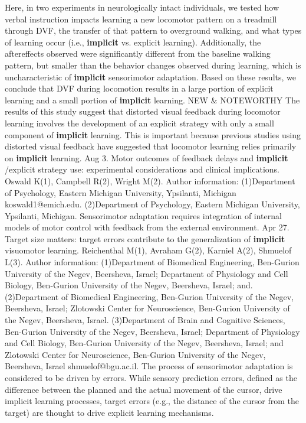 \documentclass[11pt]{article}
\begin{document}
\newline  [  91  ]   Here, in two experiments in neurologically intact individuals, we tested  how verbal instruction impacts learning a new locomotor pattern on a treadmill  through DVF, the transfer of that pattern to overground walking, and what types  of learning occur (i.e.,   \textbf {  implicit  }   vs. explicit learning).
\newline  [  92  ]   Additionally, the aftereffects observed were significantly  different from the baseline walking pattern, but smaller than the behavior  changes observed during learning, which is uncharacteristic of   \textbf {  implicit  }    sensorimotor adaptation.
\newline  [  93  ]   Based on these  results, we conclude that DVF during locomotion results in a large portion of  explicit learning and a small portion of   \textbf {  implicit  }   learning.
\newline  [  94  ]   NEW & NOTEWORTHY The  results of this study suggest that distorted visual feedback during locomotor  learning involves the development of an explicit strategy with only a small  component of   \textbf {  implicit  }   learning.
\newline  [  95  ]   This is important because previous studies using  distorted visual feedback have suggested that locomotor learning relies  primarily on   \textbf {  implicit  }   learning.
 Aug 3.  Motor outcomes of feedback delays and   \textbf {  implicit  }  /explicit strategy use:  experimental considerations and clinical implications.  Oswald K(1), Campbell R(2), Wright M(2).  Author information: (1)Department of Psychology, Eastern Michigan University, Ypsilanti, Michigan  koswald1@emich.edu. (2)Department of Psychology, Eastern Michigan University, Ypsilanti, Michigan.  Sensorimotor adaptation requires integration of internal models of motor control  with feedback from the external environment.
\newline  [  97  ]  Apr 27.  Target size matters: target errors contribute to the generalization of   \textbf {  implicit  }    visuomotor learning.  Reichenthal M(1), Avraham G(2), Karniel A(2), Shmuelof L(3).  Author information: (1)Department of Biomedical Engineering, Ben-Gurion University of the Negev,  Beersheva, Israel; Department of Physiology and Cell Biology, Ben-Gurion  University of the Negev, Beersheva, Israel; and. (2)Department of Biomedical Engineering, Ben-Gurion University of the Negev,  Beersheva, Israel; Zlotowski Center for Neuroscience, Ben-Gurion University of  the Negev, Beersheva, Israel. (3)Department of Brain and Cognitive Sciences, Ben-Gurion University of the  Negev, Beersheva, Israel; Department of Physiology and Cell Biology, Ben-Gurion  University of the Negev, Beersheva, Israel; and Zlotowski Center for  Neuroscience, Ben-Gurion University of the Negev, Beersheva, Israel  shmuelof@bgu.ac.il.  The process of sensorimotor adaptation is considered to be driven by errors.  While sensory prediction errors, defined as the difference between the planned  and the actual movement of the cursor, drive implicit learning processes, target  errors (e.g., the distance of the cursor from the target) are thought to drive  explicit learning mechanisms.
\end{document}
